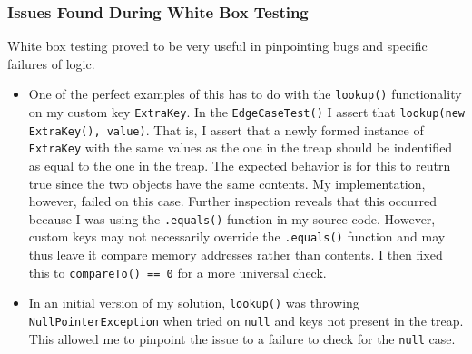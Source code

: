 \documentclass[11pt]{article}
\def\tt{\texttt}
\def\NPE{\tt{NullPointerException}}
\def\lu{\tt{lookup()}}
\begin{document}
\subsubsection{Issues Found During White Box Testing}
White box testing proved to be very useful in pinpointing bugs and specific failures of logic. 
\begin{itemize}
\item One of the perfect examples of this has to do with the \lu{} functionality on my custom key \tt{ExtraKey}. In the \tt{EdgeCaseTest()} I assert that \tt{lookup(new ExtraKey(), value)}. That is, I assert that a newly formed instance of \tt{ExtraKey} with the same values as the one in the treap should be indentified as equal to the one in the treap. The expected behavior is for this to reutrn true since the two objects have the same contents. My implementation, however, failed on this case. Further inspection reveals that this occurred because I was using the \tt{.equals()} function in my source code. However, custom keys may not necessarily override the \tt{.equals()} function and may thus leave it compare memory addresses rather than contents. I then fixed this to \tt{compareTo() == 0} for a more universal check.
\item In an initial version of my solution, \lu{} was throwing \NPE{} when tried on \tt{null} and keys not present in the treap. This allowed me to pinpoint the issue to a failure to check for the \tt{null} case. 
\end{itemize}
\end{document}
